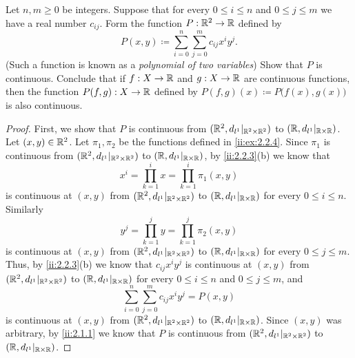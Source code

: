 \begin{ex}\label{ii:ex:2.2.5}
  Let \(n, m \geq 0\) be integers.
  Suppose that for every \(0 \leq i \leq n\) and \(0 \leq j \leq m\) we have a real number \(c_{ij}\).
  Form the function \(P : \mathbb{R}^2 \to \mathbb{R}\) defined by
  \[
    P(x, y) \coloneqq \sum_{i = 0}^n \sum_{j = 0}^m c_{ij} x^i y^j.
  \]
  (Such a function is known as a \emph{polynomial of two variables})
  Show that \(P\) is continuous.
  Conclude that if \(f : X \to \mathbb{R}\) and \(g : X \to \mathbb{R}\) are continuous functions, then the function \(P(f, g) : X \to \mathbb{R}\) defined by \(P(f, g)(x) \coloneqq P\big(f(x), g(x)\big)\) is also continuous.
\end{ex}

\begin{proof}
  First, we show that \(P\) is continuous from \((\mathbb{R}^2, d_{l^1}|_{\mathbb{R}^2 \times \mathbb{R}^2})\) to \((\mathbb{R}, d_{l^1}|_{\mathbb{R} \times \mathbb{R}})\).
  Let \((x, y) \in \mathbb{R}^2\).
  Let \(\pi_1, \pi_2\) be the functions defined in \cref{ii:ex:2.2.4}.
  Since \(\pi_1\) is continuous from \((\mathbb{R}^2, d_{l^1}|_{\mathbb{R}^2 \times \mathbb{R}^2})\) to \((\mathbb{R}, d_{l^1}|_{\mathbb{R} \times \mathbb{R}})\), by \cref{ii:2.2.3}(b) we know that
  \[
    x^i = \prod_{k = 1}^i x = \prod_{k = 1}^i \pi_1(x, y)
  \]
  is continuous at \((x, y)\) from \((\mathbb{R}^2, d_{l^1}|_{\mathbb{R}^2 \times \mathbb{R}^2})\) to \((\mathbb{R}, d_{l^1}|_{\mathbb{R} \times \mathbb{R}})\) for every \(0 \leq i \leq n\).
  Similarly
  \[
    y^j = \prod_{k = 1}^j y = \prod_{k = 1}^j \pi_2(x, y)
  \]
  is continuous at \((x, y)\) from \((\mathbb{R}^2, d_{l^1}|_{\mathbb{R}^2 \times \mathbb{R}^2})\) to \((\mathbb{R}, d_{l^1}|_{\mathbb{R} \times \mathbb{R}})\) for every \(0 \leq j \leq m\).
  Thus, by \cref{ii:2.2.3}(b) we know that \(c_{ij} x^i y^j\) is continuous at \((x, y)\) from \((\mathbb{R}^2, d_{l^1}|_{\mathbb{R}^2 \times \mathbb{R}^2})\) to \((\mathbb{R}, d_{l^1}|_{\mathbb{R} \times \mathbb{R}})\) for every \(0 \leq i \leq n\) and \(0 \leq j \leq m\), and
  \[
    \sum_{i = 0}^n \sum_{j = 0}^m c_{ij} x^i y^j = P(x, y)
  \]
  is continuous at \((x, y)\) from \((\mathbb{R}^2, d_{l^1}|_{\mathbb{R}^2 \times \mathbb{R}^2})\) to \((\mathbb{R}, d_{l^1}|_{\mathbb{R} \times \mathbb{R}})\).
  Since \((x, y)\) was arbitrary, by \cref{ii:2.1.1} we know that \(P\) is continuous from \((\mathbb{R}^2, d_{l^1}|_{\mathbb{R}^2 \times \mathbb{R}^2})\) to \((\mathbb{R}, d_{l^1}|_{\mathbb{R} \times \mathbb{R}})\).


\end{proof}
